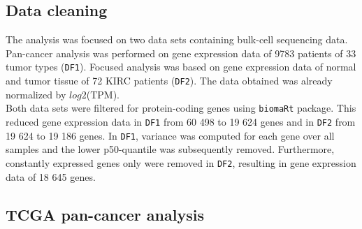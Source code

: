\documentclass[
  parskip,
  oneside]{\documentclass[oneside]{book}}
\begin{document}
\hypertarget{data-cleaning}{%
\subsection{Data cleaning}\label{data-cleaning}}

The analysis was focused on two data sets containing bulk-cell
sequencing data. Pan-cancer analysis was performed on gene expression
data of 9783 patients of 33 tumor types (\texttt{DF1}). Focused analysis
was based on gene expression data of normal and tumor tissue of 72 KIRC
patients (\texttt{DF2}). The data obtained was already normalized by
\(log2\)(TPM).\\
Both data sets were filtered for protein-coding genes using
\texttt{biomaRt} package. This reduced gene expression data in
\texttt{DF1} from 60 498 to 19 624 genes and in \texttt{DF2} from 19 624
to 19 186 genes. In \texttt{DF1}, variance was computed for each gene
over all samples and the lower p50-quantile was subsequently removed.
Furthermore, constantly expressed genes only were removed in
\texttt{DF2}, resulting in gene expression data of 18 645 genes.

\hypertarget{tcga-pan-cancer-analysis}{%
\subsection{TCGA pan-cancer analysis}\label{tcga-pan-cancer-analysis}}
\end{document}
